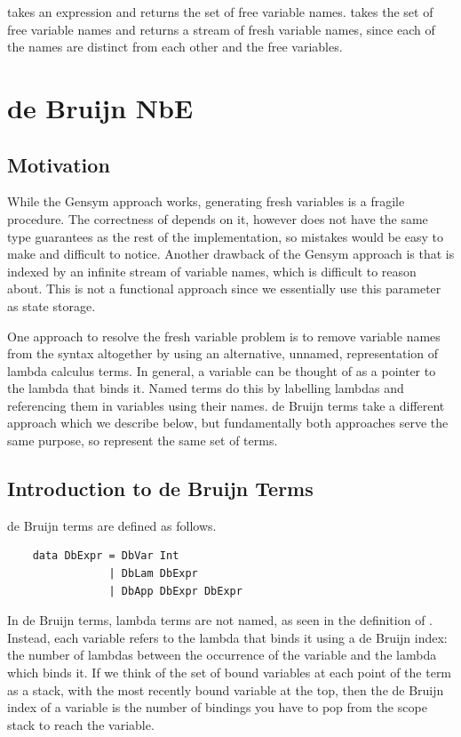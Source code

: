  takes an expression and returns the set of free variable names.  takes the set of free variable names and returns a stream of fresh variable names, since each of the names are distinct from each other and the free variables.

\section{de Bruijn NbE}

\subsection{Motivation}

While the Gensym approach works, generating fresh variables is a fragile procedure. The correctness of  depends on it, however  does not have the same type guarantees as the rest of the implementation, so mistakes would be easy to make and difficult to notice. Another drawback of the Gensym approach is that  is indexed by an infinite stream of variable names, which is difficult to reason about. This is not a functional approach since we essentially use this parameter as state storage. 

One approach to resolve the fresh variable problem is to remove variable names from the syntax altogether by using an alternative, unnamed, representation of lambda calculus terms. In general, a variable can be thought of as a pointer to the lambda that binds it. Named terms do this by labelling lambdas and referencing them in variables using their names. de Bruijn terms take a different approach which we describe below, but fundamentally both approaches serve the same purpose, so represent the same set of terms.

\subsection{Introduction to de Bruijn Terms}

de Bruijn terms are defined as follows. \cite{deBruijnNotation}

\begin{lstlisting}
    data DbExpr = DbVar Int
                | DbLam DbExpr
                | DbApp DbExpr DbExpr
\end{lstlisting}

In de Bruijn terms, lambda terms are not named, as seen in the definition of . Instead, each variable refers to the lambda that binds it using a de Bruijn index: the number of lambdas between the occurrence of the variable and the lambda which binds it. If we think of the set of bound variables at each point of the term as a stack, with the most recently bound variable at the top, then the de Bruijn index of a variable is the number of bindings you have to pop from the scope stack to reach the variable.

